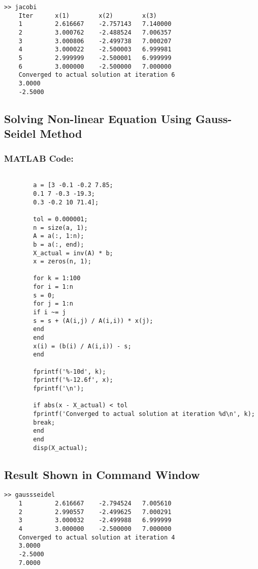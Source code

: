 \documentclass[a4paper,12pt]{article}
\begin{document}
	\begin{lstlisting}[style=vscode-light, caption={Command Window for Jacobi Method} ]
	>> jacobi
	Iter      x(1)        x(2)        x(3)        
	1         2.616667    -2.757143   7.140000    
	2         3.000762    -2.488524   7.006357    
	3         3.000806    -2.499738   7.000207    
	4         3.000022    -2.500003   6.999981    
	5         2.999999    -2.500001   6.999999    
	6         3.000000    -2.500000   7.000000    
	Converged to actual solution at iteration 6
	3.0000
	-2.5000
	\end{lstlisting}
	
	\subsection{Solving Non-linear Equation Using Gauss-Seidel Method}

	\subsubsection{MATLAB Code:}
	\begin{lstlisting}[style=vscode-light, caption={Solving Non-linear Equation Using  Gauss-Seidel Method in MATLAB.} ]
		
		a = [3 -0.1 -0.2 7.85;
		0.1 7 -0.3 -19.3;
		0.3 -0.2 10 71.4];  
		
		tol = 0.000001;
		n = size(a, 1);              
		A = a(:, 1:n);              
		b = a(:, end);              
		X_actual = inv(A) * b;
		x = zeros(n, 1);            
		
		for k = 1:100
		for i = 1:n
		s = 0;
		for j = 1:n
		if i ~= j
		s = s + (A(i,j) / A(i,i)) * x(j);
		end
		end
		x(i) = (b(i) / A(i,i)) - s;
		end
		
		fprintf('%-10d', k);
		fprintf('%-12.6f', x);
		fprintf('\n');
		
		if abs(x - X_actual) < tol
		fprintf('Converged to actual solution at iteration %d\n', k);
		break;
		end
		end
		disp(X_actual);
	\end{lstlisting}
	
	
	
	\newpage
	\subsection{Result Shown in Command Window}
	
	\begin{lstlisting}[style=vscode-light, caption={Command Window for Gauss-Seidel Method} ]
	>> gaussseidel
	1         2.616667    -2.794524   7.005610    
	2         2.990557    -2.499625   7.000291    
	3         3.000032    -2.499988   6.999999    
	4         3.000000    -2.500000   7.000000    
	Converged to actual solution at iteration 4
	3.0000
	-2.5000
	7.0000
		
	\end{lstlisting}
	
\end{document}
